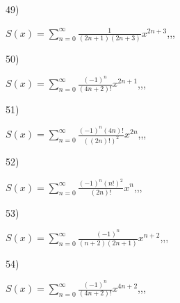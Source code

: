 \documentclass[11pt, ukrainian]{article}
\begin{document}
\par
\vspace{0.9cm}
49) \space 
{%
{$S(x)=\sum\limits_{n=0}^{\infty}{\frac{1}{(2n+1)(2n+3)}}{x^{{2n+3}}}$},,, \par \smallskip  
}
\par
\vspace{0.9cm}
50) \space 
{%
{$S(x)=\sum\limits_{n=0}^{\infty}{\frac{(-1)^n}{(4n+2)!}}{x^{{2n+1}}}$},,, \par \smallskip  
}
\par
\newpage
51) \space 
{%
{$S(x)=\sum\limits_{n=0}^{\infty}{\frac{{(-1)^n}(4n)!}{{((2n)!)^2}}}{x^{{2n}}}$},,, \par \smallskip  
}
\par
\vspace{0.9cm}
52) \space 
{%
{$S(x)=\sum\limits_{n=0}^{\infty}{\frac{{(-1)^n}{(n!)^2}}{(2n)!}}{x^{{n}}}$},,, \par \smallskip  
}
\par
\vspace{0.9cm}
53) \space 
{%
{$S(x)=\sum\limits_{n=0}^{\infty}{\frac{(-1)^n}{(n+2)(2n+1)}}{x^{{n+2}}}$},,, \par \smallskip  
}
\par
\vspace{0.9cm}
54) \space 
{%
{$S(x)=\sum\limits_{n=0}^{\infty}{\frac{(-1)^n}{(4n+2)!}}{x^{{4n+2}}}$},,, \par \smallskip  
}
\end{document}
